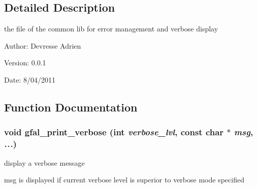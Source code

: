\subsection{Detailed Description}
the file of the common lib for error management and verbose display 

\begin{Desc}
\item[Author:]Devresse Adrien \end{Desc}
\begin{Desc}
\item[Version:]0.0.1 \end{Desc}
\begin{Desc}
\item[Date:]8/04/2011 \end{Desc}


\subsection{Function Documentation}
\subsubsection{\setlength{\rightskip}{0pt plus 5cm}void gfal\_\-print\_\-verbose (int {\em verbose\_\-lvl}, const char $\ast$ {\em msg},  {\em ...})}\label{gfal__common__errverbose_8c_8b05640b4b43a776603bd93703c29d30}


display a verbose message 

msg is displayed if current verbose level is superior to verbose mode specified 